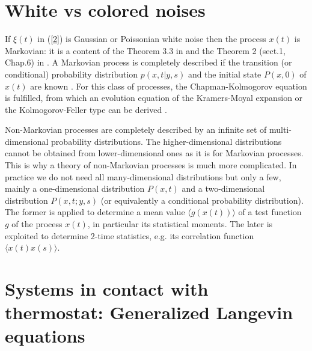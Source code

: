 \documentclass[authoryear,draft,1p,times]{elsarticle}
\renewcommand{\=}{\stackrel{\mathrm{d}}{=}}
\begin{document}





\section{White vs colored noises } 
If $\xi(t)$ in (\ref{2}) is Gaussian or Poissonian 
white noise then the process $x(t)$ is 
Markovian: it is a content of the Theorem 3.3 in  \cite{doob} 
and the Theorem 2 (sect.1, Chap.6) in \cite{gih}.   
A Markovian process is completely described if  the transition 
(or conditional) probability distribution $p(x,t|y,s)$ 
and the initial state $P(x,0)$ of $x(t)$ are known \cite{thomas}.  
 For this class of processes, the Chapman-Kolmogorov equation 
is fulfilled, from which an evolution equation of the 
Kramers-Moyal expansion or the Kolmogorov-Feller type 
can be derived \cite{gar}.   

Non-Markovian processes are  completely described by an infinite set 
of multi-dimensional probability distributions. The higher-dimensional 
 distributions cannot be obtained from lower-dimensional ones 
as it is  for Markovian processes.  
 This is why a 
theory of non-Markovian  processes is much more complicated. In practice we do not need 
all many-dimensional distributions but only a few, mainly a one-dimensional 
distribution $P(x, t)$ and  a two-dimensional distribution 
$P(x,t;y,s)$ (or equivalently a conditional probability distribution). 
The former is applied to determine a mean value $\langle g(x(t))\rangle$ 
of a  test function $g$  of  the process $x(t)$, in particular its statistical moments. The later is 
exploited to determine 2-time statistics, e.g. its  correlation 
function $\langle x(t) x(s)\rangle$.






\section{Systems in contact with thermostat: Generalized Langevin equations}
\end{document}
